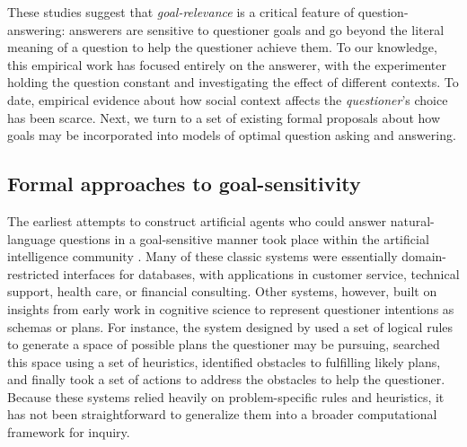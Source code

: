 \documentclass[11pt, floatsintext]{apa6}
\begin{document}



These studies suggest that \emph{goal-relevance} is a critical feature of question-answering: answerers are sensitive to questioner goals and go beyond the literal meaning of a question to help the questioner achieve them. 
To our knowledge, this empirical work has focused entirely on the answerer, with the experimenter holding the question constant and investigating the effect of different contexts. 
To date, empirical evidence about how social context affects the \emph{questioner}'s choice has been scarce. 
Next, we turn to a set of existing formal proposals about how goals may be incorporated into models of optimal question asking and answering.

\subsection{Formal approaches to goal-sensitivity}

The earliest attempts to construct artificial agents who could answer natural-language questions in a goal-sensitive manner took place within the artificial intelligence community \cite{Simmons65_QuestionsComputer, Lehnert77_QuestionAnswering, AllenPerrault80_IntentionUtterances, GreenCarberry94_IndirectAnswersModel, MollaVicedo07_QARestrictedDomains}. 
Many of these classic systems were essentially domain-restricted interfaces for databases, with applications in customer service, technical support, health care, or financial consulting.
Other systems, however, built on insights from early work in cognitive science to represent questioner intentions as schemas or plans. 
For instance, the system designed by  used a set of logical rules to generate a space of possible plans the questioner may be pursuing, searched this space using a set of heuristics, identified obstacles to fulfilling likely plans, and finally took a set of actions to address the obstacles to help the questioner. 
Because these systems relied heavily on problem-specific rules and heuristics, it has not been straightforward to generalize them into a broader computational framework for inquiry.
\end{document}
